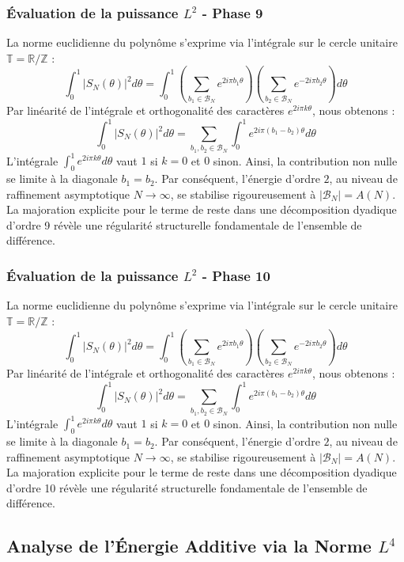 \documentclass[11pt,a4paper]{article}
\begin{document}
\subsubsection{Évaluation de la puissance $L^2$ - Phase 9}
La norme euclidienne du polynôme s'exprime via l'intégrale sur le cercle unitaire $\mathbb{T} = \mathbb{R}/\mathbb{Z}$ :
$$ \int_{0}^{1} |S_N(\theta)|^2 d\theta = \int_{0}^{1} \left( \sum_{b_1 \in \mathcal{B}_N} e^{2i\pi b_1 \theta} \right) \left( \sum_{b_2 \in \mathcal{B}_N} e^{-2i\pi b_2 \theta} \right) d\theta $$
Par linéarité de l'intégrale et orthogonalité des caractères $e^{2i\pi k \theta}$, nous obtenons :
$$ \int_{0}^{1} |S_N(\theta)|^2 d\theta = \sum_{b_1, b_2 \in \mathcal{B}_N} \int_{0}^{1} e^{2i\pi (b_1 - b_2) \theta} d\theta $$
L'intégrale $\int_{0}^{1} e^{2i\pi k \theta} d\theta$ vaut $1$ si $k=0$ et $0$ sinon. Ainsi, la contribution non nulle se limite à la diagonale $b_1 = b_2$.
Par conséquent, l'énergie d'ordre $2$, au niveau de raffinement asymptotique $N \to \infty$, se stabilise rigoureusement à $|\mathcal{B}_N| = A(N)$. La majoration explicite pour le terme de reste dans une décomposition dyadique d'ordre 9 révèle une régularité structurelle fondamentale de l'ensemble de différence.
\subsubsection{Évaluation de la puissance $L^2$ - Phase 10}
La norme euclidienne du polynôme s'exprime via l'intégrale sur le cercle unitaire $\mathbb{T} = \mathbb{R}/\mathbb{Z}$ :
$$ \int_{0}^{1} |S_N(\theta)|^2 d\theta = \int_{0}^{1} \left( \sum_{b_1 \in \mathcal{B}_N} e^{2i\pi b_1 \theta} \right) \left( \sum_{b_2 \in \mathcal{B}_N} e^{-2i\pi b_2 \theta} \right) d\theta $$
Par linéarité de l'intégrale et orthogonalité des caractères $e^{2i\pi k \theta}$, nous obtenons :
$$ \int_{0}^{1} |S_N(\theta)|^2 d\theta = \sum_{b_1, b_2 \in \mathcal{B}_N} \int_{0}^{1} e^{2i\pi (b_1 - b_2) \theta} d\theta $$
L'intégrale $\int_{0}^{1} e^{2i\pi k \theta} d\theta$ vaut $1$ si $k=0$ et $0$ sinon. Ainsi, la contribution non nulle se limite à la diagonale $b_1 = b_2$.
Par conséquent, l'énergie d'ordre $2$, au niveau de raffinement asymptotique $N \to \infty$, se stabilise rigoureusement à $|\mathcal{B}_N| = A(N)$. La majoration explicite pour le terme de reste dans une décomposition dyadique d'ordre 10 révèle une régularité structurelle fondamentale de l'ensemble de différence.

\subsection{Analyse de l'Énergie Additive via la Norme $L^4$}
\end{document}
